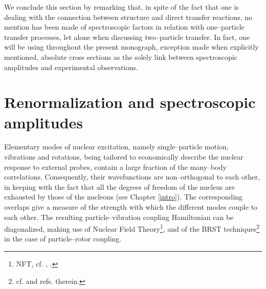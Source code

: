 We conclude this section by remarking that, in spite of the fact that one is dealing with the connection between structure and direct transfer reactions, no mention has been made of spectroscopic factors in relation with one--particle transfer processes, let alone when discussing two--particle transfer. In fact, one will be using throughout the present monograph, exception made when explicitly mentioned, absolute cross sections as the solely link between spectroscopic amplitudes and experimental observations.

\section{Renormalization and spectroscopic amplitudes}
 Elementary modes of nuclear excitation, namely single--particle motion, vibrations and rotations, being tailored to economically describe the nuclear response to external probes, contain a large fraction of the many--body correlations. Consequently, their wavefunctions are non--orthogonal to each other, in keeping with the fact that all the degrees of freedom of the nucleus are exhausted by those of the nucleons (see Chapter \ref{intro}). The corresponding overlaps give a measure of the strength with which the different modes couple to each other. The  resulting particle--vibration coupling Hamiltonian can be diagonalized,  making use of Nuclear Field Theory\footnote{NFT, cf. \cite{Bortignon:77}, \cite{Bortignon:78}.}, and of the  BRST techniques\footnote{cf. \cite{Bes:90} and refs. therein.} in the case of particle--rotor coupling. 

